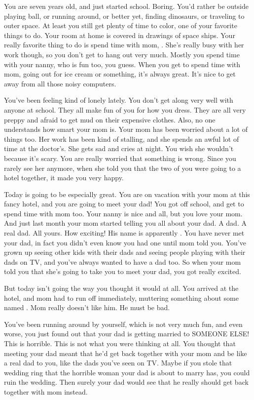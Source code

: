 \documentclass[char]{guildcamp1}
\begin{document}
\name{\cKid{}}

You are seven years old, and just started school. Boring. You'd rather be outside playing ball, or running around, or better yet, finding dinosaurs, or traveling to outer space. At least you still get plenty of time to color, one of your favorite things to do. Your room at home is covered in drawings of space ships. Your really favorite thing to do is spend time with mom, \cScientist{}. She's really busy with her work though, so you don't get to hang out very much. Mostly you spend time with your nanny, who is fun too, you guess. When you get to spend time with mom, going out for ice cream or something, it's always great. It's nice to get away from all those noisy computers.

You've been feeling kind of lonely lately. You don't get along very well with anyone at school. They all make fun of you for how you dress. They are all very preppy and afraid to get mud on their expensive clothes.  Also, no one understands how smart your mom is. Your mom has been worried about a lot of things too. Her work has been kind of stalling, and she spends an awful lot of time at the doctor's. She gets sad and cries at night. You wish she wouldn't because it's scary. You are really worried that something is wrong. Since you rarely see her anymore, when she told you that the two of you were going to a hotel together, it made you very happy.

Today is going to be especially great. You are on vacation with your mom at this fancy hotel, and you are going to meet your dad! You got off school, and get to spend time with mom too. Your nanny is nice and all, but you love your mom. And just last month your mom started telling you all about your dad. A dad. A real dad. All yours. How exciting! His name is apparently \cGroomA{}. You have never met your dad, in fact you didn't even know you had one until mom told you. You've grown up seeing other kids with their dads and seeing people playing with their dads on TV, and you've always wanted to have a dad too. So when your mom told you that she's going to take you to meet your dad, you got really excited.

But today isn't going the way you thought it would at all. You arrived at the hotel, and mom had to run off immediately, muttering something about some \cRival{\human} named \cRival{}. Mom really doesn't like him. He must be bad.

You've been running around by yourself, which is not very much fun, and even worse, you just found out that your dad is getting married to SOMEONE ELSE! This is horrible. This is not what you were thinking at all. You thought that meeting your dad meant that he'd get back together with your mom and be like a real dad to you, like the dads you've seen on TV. Maybe if you stole that wedding ring that the horrible woman your dad is about to marry has, you could ruin the wedding. Then surely your dad would see that he really should get back together with mom instead.
\end{document}
